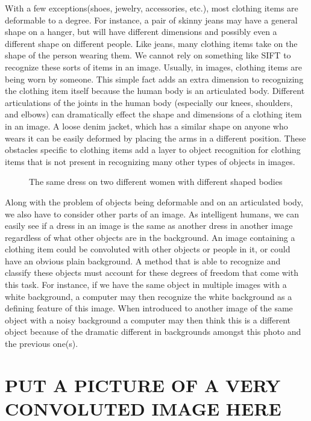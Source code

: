 \documentclass[12pt]{article} %
\begin{document}
	With a few exceptions(shoes, jewelry, accessories, etc.), most clothing items are deformable to a degree. For instance, a pair of skinny jeans may have a general shape on a hanger, but will have different dimensions and possibly even a different shape on different people. Like jeans, many clothing items take on the shape of the person wearing them. We cannot rely on something like SIFT\cite{lowe1999object} to recognize these sorts of items in an image. Usually, in images, clothing items are being worn by someone. This simple fact adds an extra dimension to recognizing the clothing item itself because the human body is an articulated body. Different articulations of the joints in the human body (especially our knees, shoulders, and elbows) can dramatically effect the shape and dimensions of a clothing item in an image. A loose denim jacket, which has a similar shape on anyone who wears it can be easily deformed by placing the arms in a different position. These obstacles specific to clothing items add a layer to object recognition for clothing items that is not present in recognizing many other types of objects in images.

\begin{figure}[h]
\caption{The same dress on two different women with different shaped bodies}\label{fig: 2}
\end{figure}

	Along with the problem of objects being deformable and on an articulated body, we also have to consider other parts of an image. As intelligent humans, we can easily see if a dress in an image is the same as another dress in another image regardless of what other objects are in the background.  An image containing a clothing item could be convoluted with other objects or people in it, or could have an obvious plain background. A method that is able to recognize and classify these objects must account for these degrees of freedom that come with this task. For instance, if we have the same object in multiple images with a white background, a computer may then recognize the white background as a defining feature of this image. When introduced to another image of the same object with a noisy background a computer may then think this is a different object because of the dramatic different in backgrounds amongst this photo and the previous one(s). 
	
 \section{PUT A PICTURE OF A  VERY CONVOLUTED IMAGE HERE }
\end{document}
